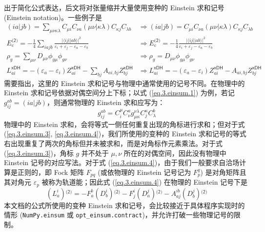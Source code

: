 出于简化公式表达，后文将对张量缩并大量使用变种的 Einstein 求和记号 (Einstein notation)。一些例子是
\begin{subequations}
\begin{align}
  \label{eq.3.einsum.1}
  (ia|jb) = \sum_{\mu \nu \kappa \lambda} C_{\mu i} C_{\nu a} (\mu \nu | \kappa \lambda) C_{\kappa j} C_{\lambda b}
  &\Rightarrow 
  (ia|jb) = C_{\mu i} C_{\nu a} (\mu \nu | \kappa \lambda) C_{\kappa j} C_{\lambda b} \\
  \label{eq.3.einsum.2}
  E_\mathrm{c}^\textsf{(2)} = - \frac{1}{4} \sum_{iajb} \frac{\big| \langle i j || a b \rangle \big|^2}{\varepsilon_i + \varepsilon_j - \varepsilon_a - \varepsilon_b}
  &\Rightarrow
  E_\mathrm{c}^\textsf{(2)} = - \frac{1}{4} \frac{\big| \langle i j || a b \rangle \big|^2}{\varepsilon_i + \varepsilon_j - \varepsilon_a - \varepsilon_b} \\
  \label{eq.3.einsum.3}
  \rho_g = \sum_{\mu \nu} D_{\mu \nu} \phi_{g \mu} \phi_{g \nu}
  &\Rightarrow
  \rho_g = D_{\mu \nu} \phi_{g \mu} \phi_{g \nu} \\
  \label{eq.3.einsum.4}
  L_{ai}^\textsf{xDH} = - (\varepsilon_a - \varepsilon_i) Z_{ai}^\textsf{xDH} - \sum_{bj} A_{ai, bj} Z_{bj}^\textsf{xDH}
  &\Rightarrow
  L_{ai}^\textsf{xDH} = - (\varepsilon_a - \varepsilon_i) Z_{ai}^\textsf{xDH} - A_{ai, bj} Z_{bj}^\textsf{xDH}
\end{align}
\end{subequations}
需要指出，这里的 Einstein 求和记号与物理中通常使用的记号不同\cite{Einstein-Einstein.AP.1916}。在物理中的 Einstein 求和记号依据对偶空间分上下标；以式 (\ref{eq.3.einsum.1}) 为例，若记 $g_{ij}^{ab} = (ia|jb)$，则通常物理的 Einstein 求和应写为：
\begin{equation*}
  g_{ij}^{ab} = C^\mu_i C^a_\nu g^{\nu \lambda}_{\mu \kappa} C^\kappa_j C^b_\lambda
\end{equation*}
物理中的 Einstein 求和，会将等式一侧任何重复出现的角标进行求和；但对于式 (\ref{eq.3.einsum.3}, \ref{eq.3.einsum.4})，我们所使用的变种的 Einstein 求和记号的等式右出现重复了两次的角标但并未被求和，而是对角标作元素乘法。对于式 (\ref{eq.3.einsum.3})，角标 $g$ 并不处于 $\mu, \nu$ 所在的对偶空间，因此没有物理中 Einstein 记号的对应写法。对于式 (\ref{eq.3.einsum.4})，由于我们一般要求自洽场计算是正则的，即 Fock 矩阵 $F_{pq}$ (或依物理的 Einstein 记号记为 $F_p^q$) 是对角矩阵且其对角元 $\varepsilon_p$ 被称为轨道能；因此式 (\ref{eq.3.einsum.4}) 在物理的 Einstein 记号下是
\begin{equation*}
  (L_a^i){}^\textsf{(2)} = - F_a^b (D_b^i){}^\textsf{(2)} - F_j^i (D_a^j){}^\textsf{(2)} - A_{aj}^{ib} (D_b^j){}^\textsf{(2)}
\end{equation*}
本文档的公式所使用的变种 Einstein 求和记号，会比较接近于具体程序实现时的情形 (\verb|NumPy.einsum| 或 \verb|opt_einsum.contract|)，并允许打破一些物理记号的限制。

